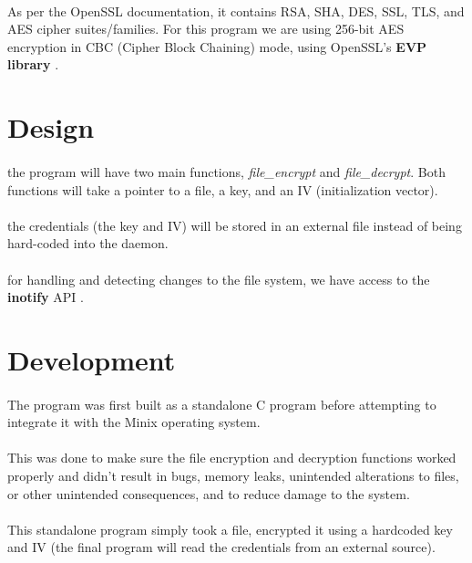 \documentclass{article}
\begin{document}
    \paragraph{}As per the OpenSSL documentation, it contains RSA, SHA, DES, SSL, TLS, and AES cipher suites/families. For this program we are using 256-bit AES encryption in CBC (Cipher Block Chaining) mode, using OpenSSL's \textbf{EVP library} \parencite{openssl_evp}.

\section{Design}
    \paragraph{}the program will have two main functions, \textit{file\_encrypt} and \textit{file\_decrypt}. Both functions will take a pointer to a file, a key, and an IV (initialization vector).
    \paragraph{}the credentials (the key and IV) will be stored in an external file instead of being hard-coded into the daemon.
    \paragraph{}for handling and detecting changes to the file system, we have access to the \textbf{inotify} API \parencite{inotify_manpage}.
    

\section{Development}
    \paragraph{}The program was first built as a standalone C program before attempting to integrate it with the Minix operating system. 
    \paragraph{}This was done to make sure the file encryption and decryption functions worked properly and didn't result in bugs, memory leaks, unintended alterations to files, or other unintended consequences, and to reduce damage to the system.
    \paragraph{}This standalone program simply took a file, encrypted it using a hardcoded key and IV (the final program will read the credentials from an external source).
\end{document}
